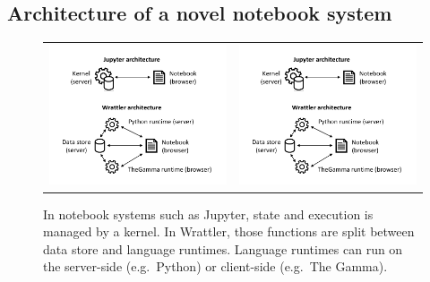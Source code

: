 \documentclass[fleqn,11pt]{report}
\theoremstyle{definition}
\begin{document}
\subsection{Architecture of a novel notebook system}

\begin{figure}[t]
\begin{tabular}{p{} p{}}
\vspace{2em}\includegraphics[scale=0.6,trim=1.5cm 6cm 1cm 0.4cm,clip]{img/arch.pdf} &
\vspace{0em}\includegraphics[scale=0.6,trim=1cm 0.5cm 1cm 4cm,clip]{img/arch.pdf}
\end{tabular}
\caption{In notebook systems such as Jupyter, state and execution is managed by a kernel. In
  Wrattler, those functions are split between data store and language runtimes. Language runtimes
  can run on the server-side (e.g.~Python) or client-side (e.g.~The Gamma).}
\label{fig:arch}
\end{figure}
\end{document}
